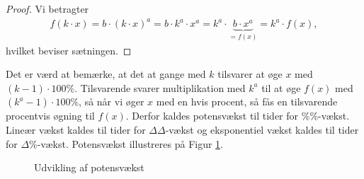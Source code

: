 \begin{proof}
Vi betragter 
\begin{align*}
f(k\cdot x) = b\cdot (k\cdot x)^a = b \cdot k^a \cdot x^a = k^a\cdot\underbrace{b\cdot x^a}_{=f(x)} = k^a \cdot f(x),
\end{align*}
hvilket beviser sætningen. 
\end{proof}
Det er værd at bemærke, at det at gange med $k$ tilsvarer at øge $x$ med $(k-1)\cdot 100 \%.$ Tilsvarende svarer multiplikation med $k^a$ til at øge $f(x)$ med $(k^a-1)\cdot 100\%$, så når vi øger $x$ med en hvis procent, så fås en tilsvarende procentvis øgning til $f(x)$. Derfor kaldes potensvækst til tider for $\%\%$-vækst. Lineær vækst kaldes til tider for $\Delta\Delta$-vækst og eksponentiel vækst kaldes til tider for $\Delta\%$-vækst. Potensvækst illustreres på Figur \ref{fig:potens}.
\begin{figure}[H]
\centering
{}
\caption{Udvikling af potensvækst}
\label{fig:potens}
\end{figure}

